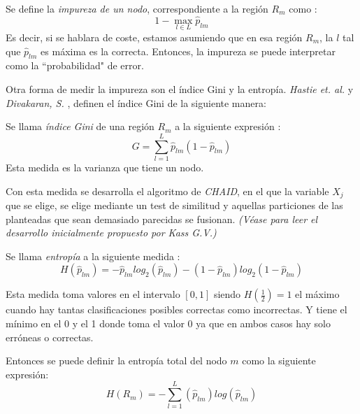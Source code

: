 \begin{defi}
Se define la \emph{impureza de un nodo}, correspondiente a la región $R_m$ como \cite{Brown 2004}:
\begin{equation}
1-\max_{l\in L} \hat{p}_{lm}
\end{equation}
\noindent Es decir, si se hablara de coste, estamos asumiendo que en esa región $R_m$, la $l$ tal que $\hat{p}_{lm}$ es máxima es la correcta. Entonces, la impureza se puede interpretar como la ``probabilidad" de error. 
\end{defi}
\noindent Otra forma de medir la impureza son el índice Gini y la entropía. \emph{Hastie et. al.} y \emph{Divakaran, S.} \cite{Hastie 2001, Divakaran 2022}, definen el índice Gini de la siguiente manera:
\begin{defi}
Se llama \emph{índice Gini} de una región $R_m$ a la siguiente expresión \cite{Hastie 2001, James 2013}:
\begin{equation}
G=\sum_{l=1}^L\hat{p}_{lm}(1-\hat{p}_{lm})
\end{equation}
Esta medida es la varianza que tiene un nodo. 
\end{defi}

\noindent Con esta medida se desarrolla el algoritmo de \emph{CHAID}, en el que la variable $X_j$ que se elige, se elige mediante un test de similitud y aquellas particiones de las planteadas que sean demasiado parecidas se fusionan.   \emph{(Véase \cite{Kass 1980} para leer el desarrollo inicialmente propuesto por Kass G.V.)} 

\begin{defi}
Se llama \emph{entropía} a la siguiente medida \cite{Brown 2004}:
\begin{equation}
H(\hat{p}_{lm})=-\hat{p}_{lm}log_2(\hat{p}_{lm})-(1-\hat{p}_{lm})log_2(1-\hat{p}_{lm})
\end{equation}

\noindent Esta medida toma valores en el intervalo $[0,1]$ siendo $H(\frac{1}{2})=1$ el máximo cuando hay tantas clasificaciones posibles correctas como incorrectas. Y tiene el mínimo en el 0 y el 1 donde toma el valor 0 ya que en ambos casos hay solo erróneas o correctas.

\noindent Entonces se puede definir la entropía total del nodo $m$ como la siguiente expresión:
\begin{equation}
H(R_m)=-\sum_{l=1}^L(\hat{p}_{lm})log(\hat{p}_{lm})
\end{equation}
\end{defi}

